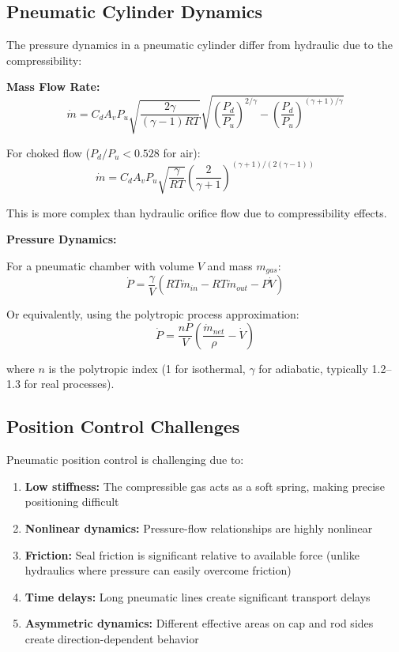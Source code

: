 \subsection{Pneumatic Cylinder Dynamics}

The pressure dynamics in a pneumatic cylinder differ from hydraulic due to the compressibility:

\textbf{Mass Flow Rate:}
\begin{equation}
    \dot{m} = C_d A_v P_u \sqrt{\frac{2\gamma}{(\gamma-1)RT}} \sqrt{\left(\frac{P_d}{P_u}\right)^{2/\gamma} - \left(\frac{P_d}{P_u}\right)^{(\gamma+1)/\gamma}}
\end{equation}

For choked flow ($P_d/P_u < 0.528$ for air):
\begin{equation}
    \dot{m} = C_d A_v P_u \sqrt{\frac{\gamma}{RT}} \left(\frac{2}{\gamma+1}\right)^{(\gamma+1)/(2(\gamma-1))}
\end{equation}

This is more complex than hydraulic orifice flow due to compressibility effects.

\textbf{Pressure Dynamics:}

For a pneumatic chamber with volume $V$ and mass $m_{gas}$:
\begin{equation}
    \dot{P} = \frac{\gamma}{V}(RT\dot{m}_{in} - RT\dot{m}_{out} - P\dot{V})
\end{equation}

Or equivalently, using the polytropic process approximation:
\begin{equation}
    \dot{P} = \frac{n P}{V}(\frac{\dot{m}_{net}}{\rho} - \dot{V})
\end{equation}

where $n$ is the polytropic index (1 for isothermal, $\gamma$ for adiabatic, typically 1.2--1.3 for real processes).

\subsection{Position Control Challenges}

Pneumatic position control is challenging due to:

\begin{enumerate}
    \item \textbf{Low stiffness:} The compressible gas acts as a soft spring, making precise positioning difficult
    \item \textbf{Nonlinear dynamics:} Pressure-flow relationships are highly nonlinear
    \item \textbf{Friction:} Seal friction is significant relative to available force (unlike hydraulics where pressure can easily overcome friction)
    \item \textbf{Time delays:} Long pneumatic lines create significant transport delays
    \item \textbf{Asymmetric dynamics:} Different effective areas on cap and rod sides create direction-dependent behavior
\end{enumerate}

